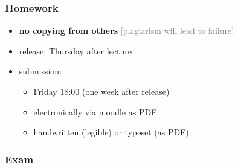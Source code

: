 \documentclass[fleqn,10pt,serif,xcolor=svgnames,xcolor=table,aspectratio=169,handout]{beamer}
\newcommand{\mycom}[1]{\hfill {\mygray{[#1]}}}
\newcommand{\mygray}[1]{\textcolor{gray}{#1}}
\begin{document}
\begin{frame}
  \frametitle{Homework}
  \begin{itemize}
    \item \textbf{no copying from others} \hfill \mycom{plagiarism will lead to failure}
    \item release: Thursday after lecture
    \item submission:
    \begin{itemize}
      \item Friday 18:00 (one week after release)
      \item electronically via moodle as PDF
      \item handwritten (legible) or typeset (as PDF)
    \end{itemize}
  \end{itemize}
\end{frame}

\begin{frame}
  \frametitle{Exam}
\end{frame}



\end{document}
